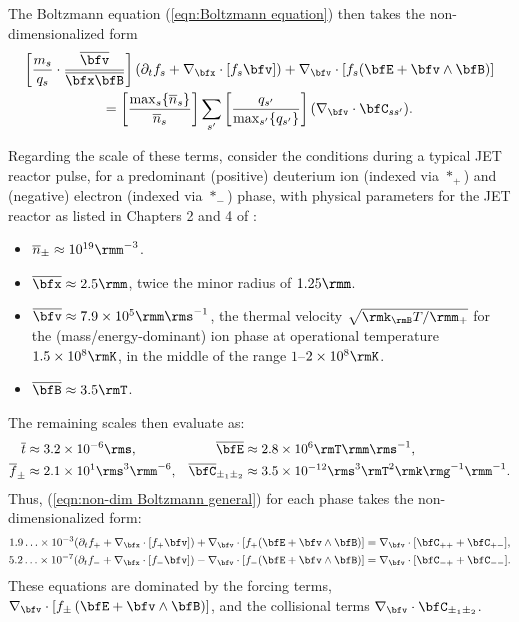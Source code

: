     The Boltzmann equation (\ref{eqn:Boltzmann equation}) then takes the non-dimensionalized form
    \begin{multline}\label{eqn:non-dim Boltzmann general}
        \left[\frac{m_{s}}{q_{s}}\cdot\frac{\overline{\bfv}}{\overline{\bfx}\overline{\bfB}}\right](\partial_{t}f_{s} + \nabla_{\bfx}\cdot[f_{s}\bfv]) + \nabla_{\bfv}\cdot[f_{s}(\bfE + \bfv\wedge\bfB)]  \\
        =  \left[\frac{\max_{s}\{\overline{n}_{s}\}}{\overline{n}_{s}}\right]\sum_{s'}\left[\frac{q_{s'}}{\max_{s'}\{q_{s'}\}}\right](\nabla_{\bfv}\cdot\bfC_{ss'}).
    \end{multline}
    
    Regarding the scale of these terms, consider the conditions during a typical JET reactor pulse, for a predominant (positive) deuterium  ion (indexed via $*_{+}$) and (negative) electron (indexed via $*_{-}$) phase, with physical parameters for the JET reactor as listed in Chapters 2 and 4 of \cite{Wes00}:
    \begin{itemize}
        \item  $\overline{n}_{\pm}  \approx  10^{19}\rmm^{- 3}$.
        \item  $\overline{\bfx}     \approx  2.5\rmm$, twice the minor radius of $1.25\rmm$.
        \item  $\overline{\bfv}     \approx  7.9\times 10^{5}\rmm\rms^{- 1}$, the thermal velocity $\sqrt{\rmk_{\rmB}T/\rmm_{+}}$ for the (mass/energy-dominant) ion phase at operational temperature $1.5\times 10^{8}\rmK$, in the middle of the range $1$–$2\times 10^{8}\rmK$.
        \item  $\overline{\bfB}     \approx  3.5\rmT$.
    \end{itemize}
    The remaining scales then evaluate as:
    \begin{align*}
        \overline{t}           &\approx  3.2\times 10^{- 6}\rms,              &
        \overline{\bfE}        &\approx  2.8\times 10^{6}\rmT\rmm\rms^{- 1},  \\
        \overline{f}_{\pm}     &\approx  2.1\times 10^{1}\rms^{3}\rmm^{- 6},  &
        \overline{\bfC}_{\pm_{1}\pm_{2}}  &\approx  3.5\times 10^{- 12}\rms^{3}\rmT^{2}\rmk\rmg^{- 1}\rmm^{- 1}.
    \end{align*}
    Thus, (\ref{eqn:non-dim Boltzmann general}) for each phase takes the non-dimensionalized form:
    \begin{align}
        1.9\ldots\times 10^{- 3}(\partial_{t}f_{+} + \nabla_{\bfx}\cdot[f_{+}\bfv]) + \nabla_{\bfv}\cdot[f_{+}(\bfE + \bfv\wedge\bfB)]  &=  \nabla_{\bfv}\cdot[\bfC_{++} + \bfC_{+-}],  \label{eqn:non-dim Boltzmann +}  \\
        5.2\ldots\times 10^{- 7}(\partial_{t}f_{-} + \nabla_{\bfx}\cdot[f_{-}\bfv]) - \nabla_{\bfv}\cdot[f_{-}(\bfE + \bfv\wedge\bfB)]  &=  \nabla_{\bfv}\cdot[\bfC_{-+} + \bfC_{--}].  \label{eqn:non-dim Boltzmann -}
    \end{align}
    These equations are dominated by the forcing terms, $\nabla_{\bfv}\cdot[f_{\pm}\left(\bfE + \bfv\wedge\bfB\right)]$, and the collisional terms $\nabla_{\bfv}\cdot\bfC_{\pm_{1}\pm_{2}}$.

